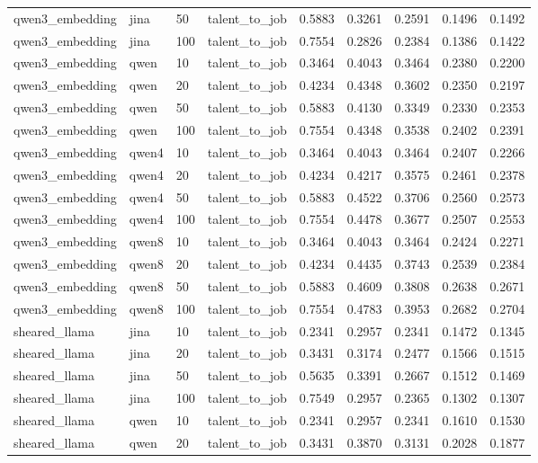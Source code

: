 \begin{table}[t]
\begin{tabular}{lllllllll}
qwen3_embedding & jina & 50 & talent_to_job & 0.5883 & 0.3261 & 0.2591 & 0.1496 & 0.1492 \\
qwen3_embedding & jina & 100 & talent_to_job & 0.7554 & 0.2826 & 0.2384 & 0.1386 & 0.1422 \\
qwen3_embedding & qwen & 10 & talent_to_job & 0.3464 & 0.4043 & 0.3464 & 0.2380 & 0.2200 \\
qwen3_embedding & qwen & 20 & talent_to_job & 0.4234 & 0.4348 & 0.3602 & 0.2350 & 0.2197 \\
qwen3_embedding & qwen & 50 & talent_to_job & 0.5883 & 0.4130 & 0.3349 & 0.2330 & 0.2353 \\
qwen3_embedding & qwen & 100 & talent_to_job & 0.7554 & 0.4348 & 0.3538 & 0.2402 & 0.2391 \\
qwen3_embedding & qwen4 & 10 & talent_to_job & 0.3464 & 0.4043 & 0.3464 & 0.2407 & 0.2266 \\
qwen3_embedding & qwen4 & 20 & talent_to_job & 0.4234 & 0.4217 & 0.3575 & 0.2461 & 0.2378 \\
qwen3_embedding & qwen4 & 50 & talent_to_job & 0.5883 & 0.4522 & 0.3706 & 0.2560 & 0.2573 \\
qwen3_embedding & qwen4 & 100 & talent_to_job & 0.7554 & 0.4478 & 0.3677 & 0.2507 & 0.2553 \\
qwen3_embedding & qwen8 & 10 & talent_to_job & 0.3464 & 0.4043 & 0.3464 & 0.2424 & 0.2271 \\
qwen3_embedding & qwen8 & 20 & talent_to_job & 0.4234 & 0.4435 & 0.3743 & 0.2539 & 0.2384 \\
qwen3_embedding & qwen8 & 50 & talent_to_job & 0.5883 & 0.4609 & 0.3808 & 0.2638 & 0.2671 \\
qwen3_embedding & qwen8 & 100 & talent_to_job & 0.7554 & 0.4783 & 0.3953 & 0.2682 & 0.2704 \\
sheared_llama & jina & 10 & talent_to_job & 0.2341 & 0.2957 & 0.2341 & 0.1472 & 0.1345 \\
sheared_llama & jina & 20 & talent_to_job & 0.3431 & 0.3174 & 0.2477 & 0.1566 & 0.1515 \\
sheared_llama & jina & 50 & talent_to_job & 0.5635 & 0.3391 & 0.2667 & 0.1512 & 0.1469 \\
sheared_llama & jina & 100 & talent_to_job & 0.7549 & 0.2957 & 0.2365 & 0.1302 & 0.1307 \\
sheared_llama & qwen & 10 & talent_to_job & 0.2341 & 0.2957 & 0.2341 & 0.1610 & 0.1530 \\
sheared_llama & qwen & 20 & talent_to_job & 0.3431 & 0.3870 & 0.3131 & 0.2028 & 0.1877 \\

\end{tabular}
\end{table}
